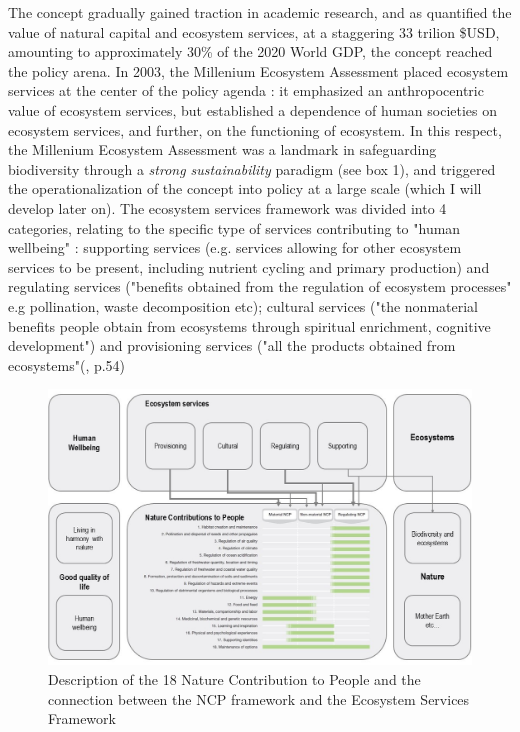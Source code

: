 The concept gradually gained traction in academic research, and as \cite{Costanza1997} quantified the value of natural capital and ecosystem services, at a staggering 33 trilion \$USD, amounting to approximately 30\% of the 2020 World GDP, the concept reached the policy arena. In 2003, the Millenium Ecosystem Assessment \citep{MEA2005} placed ecosystem services at the center of the policy agenda : it emphasized an anthropocentric value of ecosystem services, but established a dependence of human societies on ecosystem services, and further, on the functioning of ecosystem. In this respect, the Millenium Ecosystem Assessment \cite{MEA2005} was a landmark in safeguarding biodiversity through a \textit{strong sustainability} paradigm (see box 1), and triggered the operationalization of the concept into policy at a large scale (which I will develop later on). The ecosystem services framework was divided into 4 categories, relating to the specific type of services contributing to "human wellbeing" : supporting services (e.g. services allowing for other ecosystem services to be present, including nutrient cycling and primary production) and regulating services ("benefits obtained from the regulation of ecosystem processes" e.g pollination, waste decomposition etc); cultural services ("the nonmaterial benefits people obtain from ecosystems through spiritual enrichment, cognitive development") and provisioning services ("all the products obtained from ecosystems"(\cite{MEA2005}, p.54)

\begin{figure}[h]
	\centering
	\includegraphics[width = \textwidth]{figures/intro/NCPs2.jpg}
	\caption{Description of the 18 Nature Contribution to People and the connection between the NCP framework \citep{ipbes_2022_6417333} and the Ecosystem Services Framework \citep{millennium2005ecosystems}}
\end{figure}

